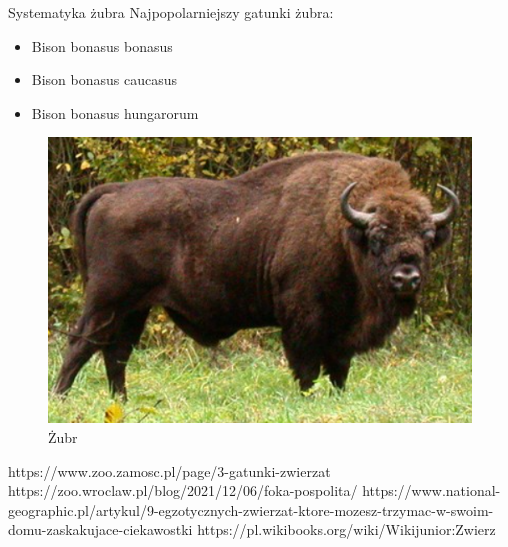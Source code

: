 \documentclass[hyperref={colorlinks = true,linkcolor = black}]{beamer}
\begin{document}
\begin{frame}{Systematyka żubra}
Najpopolarniejszy gatunki żubra:
\begin{itemize}
  \item Bison bonasus bonasus
  \item Bison bonasus caucasus
  \item Bison bonasus hungarorum
\end{itemize}

\begin{figure}[h]
\includegraphics[scale=0.5]{zubr1.png}
\caption{Żubr}
\label{fig:obr9}
\end{figure}


\end{frame}



\begin{thebibliography}{4}
 https://www.zoo.zamosc.pl/page/3-gatunki-zwierzat
 https://zoo.wroclaw.pl/blog/2021/12/06/foka-pospolita/
 https://www.national-geographic.pl/artykul/9-egzotycznych-zwierzat-ktore-mozesz-trzymac-w-swoim-domu-zaskakujace-ciekawostki
 https://pl.wikibooks.org/wiki/Wikijunior:Zwierz%
\end{thebibliography}
\end{document}
